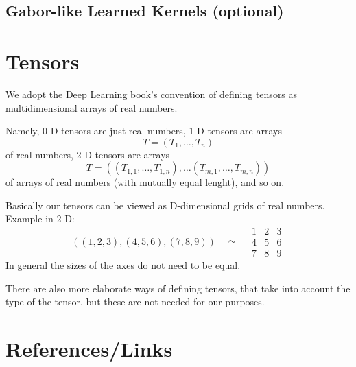 \documentclass[]{article}
\begin{document}
\subsection{Gabor-like Learned Kernels (optional)}

\section{Tensors}

We adopt the Deep Learning book's convention of defining tensors as
multidimensional arrays of real numbers.

Namely, 0-D tensors are just real numbers, 1-D tensors are arrays
\[
T = (T_1, \ldots, T_n)
\]
of real numbers, 2-D tensors are arrays
\[
T = ((T_{1,1}, \ldots, T_{1,n}), \ldots (T_{m,1}, \ldots, T_{m,n}))
\]
of arrays of real numbers (with mutually equal lenght), and so on.

Basically our tensors can be viewed as D-dimensional grids of real numbers.
Example in 2-D:
\[
((1, 2, 3), (4, 5, 6), (7, 8, 9)) \quad \simeq \quad
\begin{array}{c|c|c}
  1 & 2 & 3 \\
  \hline
  4 & 5 & 6 \\
  \hline
  7 & 8 & 9
 \end{array}
\]
In general the sizes of the axes do not need to be equal.

There are also more elaborate ways of defining tensors, that take into account
the type of the tensor, but these are not needed for our purposes.

\section{References/Links}
\end{document}
